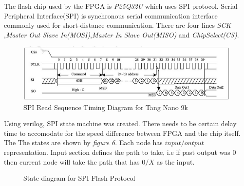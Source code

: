 \documentclass[a4paper,12pt]{article}
\begin{document}
    The flash chip used by the FPGA is \textit{P25Q32U} which uses SPI protocol. Serial Peripheral Interface(SPI) is synchronous serial communication interface commonly used for short-distance communication. There are four lines \textit{SCK} ,\textit{Master Out Slave In(MOSI)},\textit{Master In Slave Out(MISO)} and \textit{ChipSelect(CS)}. 

    \begin{figure}[H]
        \centering
        \includegraphics[width=1\textwidth]{./images/spi_flash.png}
        \caption{SPI Read Sequence Timing Diagram for Tang Nano 9k}
    \end{figure}

    Using verilog, SPI state machine was created. There needs to be certain delay time to accomodate for the speed difference between FPGA and the chip itself. The The states are shown by \textit{figure 6}. Each node has \textit{$input/output$} representation. Input section defines the path to take, i.e if past output was 0 then current node will take the path that has \textit{$0/X$} as the input. 

     \begin{figure}[h!]
    \caption{State diagram for SPI Flash Protocol}
    \end{figure}
\end{document}
